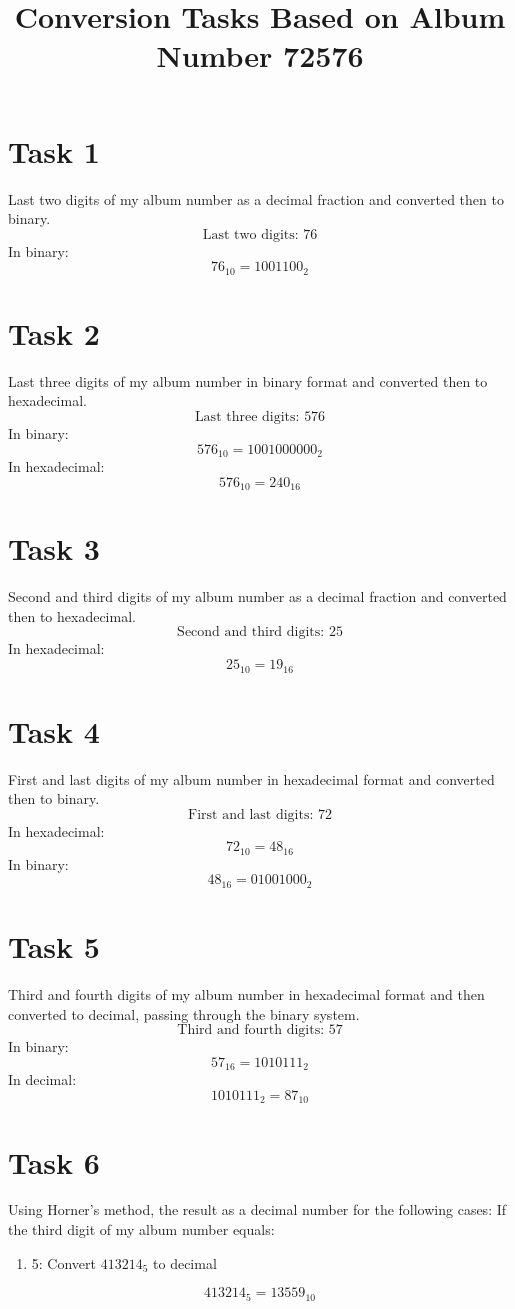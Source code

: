 \documentclass{article}
\begin{document}
\title{Conversion Tasks Based on Album Number 72576}
\author{}
\date{}
\maketitle
\section*{Task 1}
Last two digits of my album number as a decimal fraction and converted then to binary.
\[
\text{Last two digits: } 76
\]
In binary:
\[
76_{10} = 1001100_2
\]
\section*{Task 2}
Last three digits of my album number in binary format and converted then to hexadecimal.
\[
\text{Last three digits: } 576
\]
In binary:
\[
576_{10} = 1001000000_2
\]
In hexadecimal:
\[
576_{10} = 240_{16}
\]
\section*{Task 3}
Second and third digits of my album number as a decimal fraction and converted then to hexadecimal.
\[
\text{Second and third digits: } 25
\]
In hexadecimal:
\[
25_{10} = 19_{16}
\]
\section*{Task 4}
First and last digits of my album number in hexadecimal format and converted then to binary.
\[
\text{First and last digits: } 72
\]
In hexadecimal:
\[
72_{10} = 48_{16}
\]
In binary:
\[
48_{16} = 01001000_2
\]
\section*{Task 5}
Third and fourth digits of my album number in hexadecimal format and then converted to decimal, passing through the binary system.
\[
\text{Third and fourth digits: } 57
\]
In binary:
\[
57_{16} = 1010111_2
\]
In decimal:
\[
1010111_2 = 87_{10}
\]
\section*{Task 6}
Using Horner's method, the result as a decimal number for the following cases:
If the third digit of my album number equals:
\begin{enumerate}
    \item 5: Convert \( 413214_5 \) to decimal
\end{enumerate}
\[
413214_5 = 13559_{10}
\]
\end{document}
